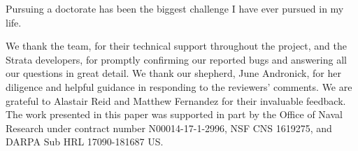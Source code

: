 Pursuing a doctorate has been the biggest challenge I have ever pursued
in my life.

We thank the \K team, for their technical support throughout the project, and
the Strata developers, for promptly confirming our reported bugs and answering
all our questions in great detail.  We thank our shepherd, June Andronick, for
her diligence and helpful guidance in responding to the reviewers' comments. We
are grateful to Alastair Reid and Matthew Fernandez for their invaluable
feedback.
The work presented in this paper was supported in part by the Office of Naval
Research under contract number N00014-17-1-2996, NSF CNS 1619275, and DARPA Sub
HRL 17090-181687 US.
